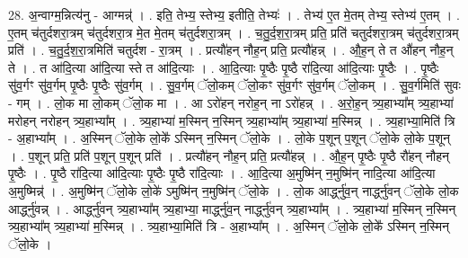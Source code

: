 \documentclass[17pt]{extarticle}
\begin{document}
28. अ॒न्वाग्म॒न्नित्य॑नु - आग्मन्न्॑ । . इति॒ तेभ्य॒ स्तेभ्य॒ इतीति॒ तेभ्यः॑ । . तेभ्य॑ ए॒त मे॒तम् तेभ्य॒ स्तेभ्य॑ ए॒तम् । . ए॒तम् च॑तुर्दशरा॒त्रम् च॑तुर्दशरा॒त्र मे॒त मे॒तम् च॑तुर्दशरा॒त्रम् । . च॒तु॒र्द॒श॒रा॒त्रम् प्रति॒ प्रति॑ चतुर्दशरा॒त्रम् च॑तुर्दशरा॒त्रम् प्रति॑ । . च॒तु॒र्द॒श॒रा॒त्रमिति॑ चतुर्दश - रा॒त्रम् । . प्रत्यौ॑हन् नौह॒न् प्रति॒ प्रत्यौ॑हन्न् । . औ॒ह॒न् ते त औ॑हन् नौह॒न् ते । . त आ॑दि॒त्या आ॑दि॒त्या स्ते त आ॑दि॒त्याः । . आ॒दि॒त्याः पृ॒ष्ठैः पृ॒ष्ठै रा॑दि॒त्या आ॑दि॒त्याः पृ॒ष्ठैः । . पृ॒ष्ठैः सु॑व॒र्गꣳ सु॑व॒र्गम् पृ॒ष्ठैः पृ॒ष्ठैः सु॑व॒र्गम् । . सु॒व॒र्गम् ॅलो॒कम् ॅलो॒कꣳ सु॑व॒र्गꣳ सु॑व॒र्गम् ॅलो॒कम् । . सु॒व॒र्गमिति॑ सुवः - गम् । . लो॒क मा लो॒कम् ॅलो॒क मा । . आ ऽरो॑हन् नरोह॒न् ना ऽरो॑हन्न् । . अ॒रो॒ह॒न् त्र्य॒हाभ्या᳚म् त्र्य॒हाभ्या॑ मरोहन् नरोहन् त्र्य॒हाभ्या᳚म् । . त्र्य॒हाभ्या॑ म॒स्मिन् न॒स्मिन् त्र्य॒हाभ्या᳚म् त्र्य॒हाभ्या॑ म॒स्मिन्न् । . त्र्य॒हाभ्या॒मिति॑ त्रि - अ॒हाभ्या᳚म् । . अ॒स्मिन् ॅलो॒के लो॒के᳚ ऽस्मिन् न॒स्मिन् ॅलो॒के । . लो॒के प॒शून् प॒शून् ॅलो॒के लो॒के प॒शून् । . प॒शून् प्रति॒ प्रति॑ प॒शून् प॒शून् प्रति॑ । . प्रत्यौ॑हन् नौह॒न् प्रति॒ प्रत्यौ॑हन्न् । . औ॒ह॒न् पृ॒ष्ठैः पृ॒ष्ठै रौ॑हन् नौहन् पृ॒ष्ठैः । . पृ॒ष्ठै रा॑दि॒त्या आ॑दि॒त्याः पृ॒ष्ठैः पृ॒ष्ठै रा॑दि॒त्याः । . आ॒दि॒त्या अ॒मुष्मि॑न् न॒मुष्मि॑न् नादि॒त्या आ॑दि॒त्या अ॒मुष्मिन्न्॑ । . अ॒मुष्मि॑न् ॅलो॒के लो॒के॑ ऽमुष्मि॑न् न॒मुष्मि॑न् ॅलो॒के । . लो॒क आर्द्ध्नु॑व॒न् नार्द्ध्नु॑वन् ॅलो॒के लो॒क आर्द्ध्नु॑वन्न् । . आर्द्ध्नु॑वन् त्र्य॒हाभ्या᳚म् त्र्य॒हाभ्या॒ मार्द्ध्नु॑व॒न् नार्द्ध्नु॑वन् त्र्य॒हाभ्या᳚म् । . त्र्य॒हाभ्या॑ म॒स्मिन् न॒स्मिन् त्र्य॒हाभ्या᳚म् त्र्य॒हाभ्या॑ म॒स्मिन्न् । . त्र्य॒हाभ्या॒मिति॑ त्रि - अ॒हाभ्या᳚म् । . अ॒स्मिन् ॅलो॒के लो॒के᳚ ऽस्मिन् न॒स्मिन् ॅलो॒के । \newline
\end{document}
